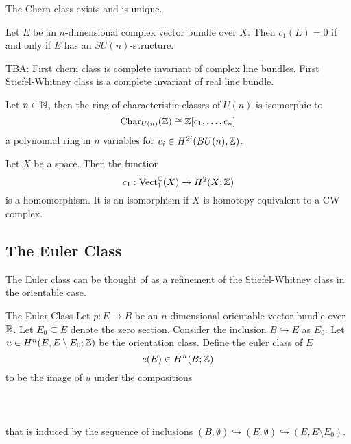 \documentclass[a4paper]{article}
\begin{document}
\begin{thm}{}{} The Chern class exists and is unique. 
\end{thm}

\begin{thm}{}{} Let $E$ be an $n$-dimensional complex vector bundle over $X$. Then $c_1(E)=0$ if and only if $E$ has an $SU(n)$-structure. 
\end{thm}

TBA: First chern class is complete invariant of complex line bundles. First Stiefel-Whitney class is a complete invariant of real line bundle. 

\begin{thm}{}{} Let $n\in\mathbb{N}$, then the ring of characteristic classes of $U(n)$ is isomorphic to $$\text{Char}_{U(n)}(\mathbb{Z})\cong\mathbb{Z}[c_1,\dots,c_n]$$ a polynomial ring in $n$ variables for $c_i\in H^{2i}(BU(n),\mathbb{Z})$. 
\end{thm}

\begin{prp}{}{} Let $X$ be a space. Then the function $$c_1:\text{Vect}_1^{\mathbb{C}}(X)\to H^2(X;\mathbb{Z})$$ is a homomorphism. It is an isomorphism if $X$ is homotopy equivalent to a CW complex. 
\end{prp}

\subsection{The Euler Class}
The Euler class can be thought of as a refinement of the Stiefel-Whitney class in the orientable case. 

\begin{defn}{The Euler Class}{} Let $p:E\to B$ be an $n$-dimensional orientable vector bundle over $\mathbb{R}$. Let $E_0\subseteq E$ denote the zero section. Consider the inclusion $B\hookrightarrow E$ as $E_0$. Let $u\in H^n(E,E\setminus E_0;\mathbb{Z})$ be the orientation class. Define the euler class of $E$ $$e(E)\in H^n(B;\mathbb{Z})$$ to be the image of $u$ under the compositions \\~\\
\\~\\
that is induced by the sequence of inclusions $(B,\emptyset)\hookrightarrow(E,\emptyset)\hookrightarrow(E,E\setminus E_0)$.
\end{defn}
\end{document}
